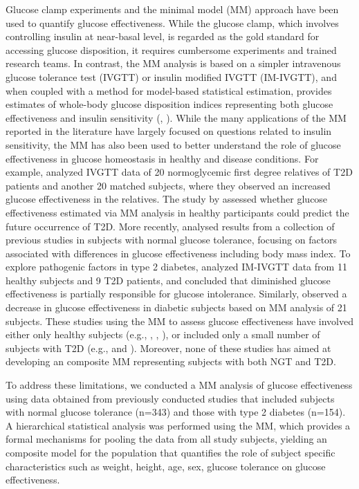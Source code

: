 \documentclass[utf8]{frontiersSCNS} %
\begin{document}
Glucose clamp experiments and the minimal model (MM) approach have been used to quantify glucose effectiveness. While the glucose clamp, which involves controlling insulin at near-basal level, is regarded as the gold standard for accessing glucose disposition, it requires cumbersome experiments and trained research teams. In contrast, the MM analysis is based on a simpler intravenous glucose tolerance test (IVGTT) or insulin modified IVGTT (IM-IVGTT), and when coupled with a method for model-based statistical estimation, provides estimates of whole-body glucose disposition indices representing both glucose effectiveness and insulin sensitivity (\citet{bergman_equ}, \citet{jan_equ}). While the many applications of the MM reported in the literature have largely focused on questions related to insulin sensitivity, the MM has also been used to better understand the role of glucose effectiveness in glucose homeostasis in healthy and disease conditions. For example, \citet{jan_relative} analyzed IVGTT data of 20 normoglycemic first degree relatives of T2D patients and another 20 matched subjects, where they observed an increased glucose effectiveness in the relatives. The study by \cite{lorenzo_2010} assessed whether glucose effectiveness estimated via MM analysis in healthy participants could predict the future occurrence of T2D. More recently, \citet{Morettini_2019} analysed results from a collection of previous studies in subjects with normal glucose tolerance, focusing on factors associated with differences in glucose effectiveness including body mass index. To explore pathogenic factors in type 2 diabetes, \citet{ataru_1992} analyzed IM-IVGTT data from 11 healthy subjects and 9 T2D patients, and concluded that diminished glucose effectiveness is partially responsible for glucose intolerance. Similarly, \citet{welch_1990} observed a decrease in glucose effectiveness in diabetic subjects based on MM analysis of 21 subjects. These studies using the MM to assess glucose effectiveness have involved either only healthy subjects (e.g., \citet{jan_relative}, \cite{lorenzo_2010}, \citet{Morettini_2019}), or included only a small number of subjects with T2D (e.g., \citet{ataru_1992} and \citet{welch_1990}). Moreover, none of these studies has aimed at developing an composite MM representing subjects with both NGT and T2D.

To address these limitations, we conducted a MM analysis of glucose effectiveness using data obtained from previously conducted studies that included subjects with normal glucose tolerance (n=343) and those with type 2 diabetes (n=154). A hierarchical statistical analysis was performed using the MM, which provides a formal mechanisms for pooling the data from all study subjects, yielding an composite model for the population that quantifies the role of subject specific characteristics such as weight, height, age, sex, glucose tolerance on glucose effectiveness.
\end{document}
